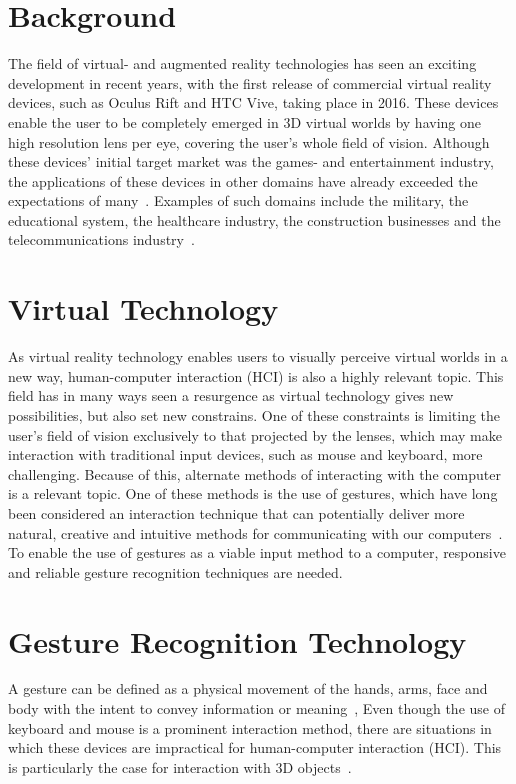 \section{Background}            
The field of virtual- and augmented reality technologies has seen an exciting development in recent years, 
with the first release of commercial virtual reality devices, such as Oculus Rift and HTC Vive, taking place in 2016. 
These devices enable the user to be completely emerged in 3D virtual worlds by having one high resolution lens per eye, 
covering the user's whole field of vision. Although these devices' initial target market was the games- and entertainment industry, 
the applications of these devices in other domains have already exceeded the expectations of many~\citep{VRS2016}. 
Examples of such domains include the military, the educational system, the healthcare industry, the construction businesses and the telecommunications industry~\citep{VRS2016}. 

\section{Virtual Technology}


As virtual reality technology enables users to visually perceive virtual worlds in a new way, 
human-computer interaction (HCI) is also a highly relevant topic. 
This field has in many ways seen a resurgence as virtual technology gives new possibilities, but also set new constrains. 
One of these constraints is limiting the user's field of vision exclusively to that projected by the lenses, 
which may make interaction with traditional input devices, such as mouse and keyboard, more challenging. 
Because of this, alternate methods of interacting with the computer is a relevant topic. 
One of these methods is the use of gestures, 
which have long been considered an interaction technique that can potentially deliver more natural, 
creative and intuitive methods for communicating with our computers~\citep{Rautaray2015}. 
To enable the use of gestures as a viable input method to a computer, responsive and reliable gesture recognition techniques are needed.  

\section{Gesture Recognition Technology}
A gesture can be defined as a physical movement of the hands, arms, face and body with the intent to convey information or meaning~\citep{Mitra2007}, 
Even though the use of keyboard and mouse is a prominent interaction method, there are situations in which
these devices are impractical for human-computer interaction (HCI). This is particularly the case for interaction with 3D objects~\citep{Rautaray2015}. 


